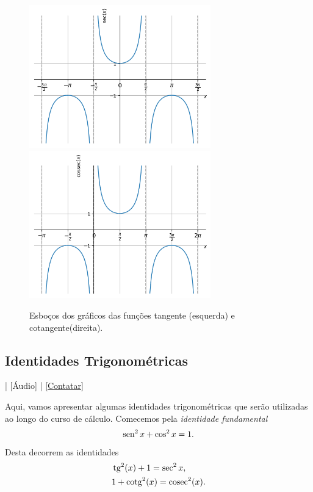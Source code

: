 \begin{figure}[H]
  \centering
  \includegraphics[width=0.7\textwidth]{./cap_funcao/dados/fig_co_sec_graficos/fig_sec_grafico}\\
  \includegraphics[width=0.7\textwidth]{./cap_funcao/dados/fig_co_sec_graficos/fig_cosec_grafico}
  \caption{Esboços dos gráficos das funções tangente (esquerda) e cotangente(direita).}
  \label{fig:co_sec_graficos}
\end{figure}

\subsection{Identidades Trigonométricas}

\begin{flushright}
  [Vídeo] | [Áudio] | \href{https://phkonzen.github.io/notas/contato.html}{[Contatar]}
\end{flushright}

Aqui, vamos apresentar algumas identidades trigonométricas que serão utilizadas ao longo do curso de cálculo. Comecemos pela \emph{identidade fundamental}
\begin{equation}
  \operatorname{sen}^2 x + \cos^2 x = 1.
\end{equation}
Desta decorrem as identidades
\begin{align}
  &\operatorname{tg}^2(x) + 1 = \sec^2 x,\\
  &1 + \operatorname{cotg}^2(x) = \operatorname{cosec}^2(x).
\end{align}

